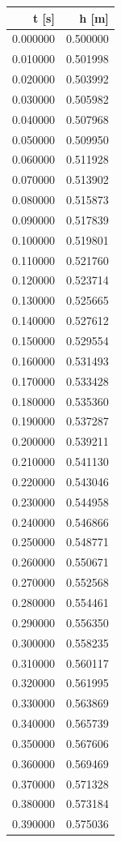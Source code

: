 \begin{tabular}{rr}
\toprule
t [s] & h [m] \\
\midrule
0.000000 & 0.500000 \\
0.010000 & 0.501998 \\
0.020000 & 0.503992 \\
0.030000 & 0.505982 \\
0.040000 & 0.507968 \\
0.050000 & 0.509950 \\
0.060000 & 0.511928 \\
0.070000 & 0.513902 \\
0.080000 & 0.515873 \\
0.090000 & 0.517839 \\
0.100000 & 0.519801 \\
0.110000 & 0.521760 \\
0.120000 & 0.523714 \\
0.130000 & 0.525665 \\
0.140000 & 0.527612 \\
0.150000 & 0.529554 \\
0.160000 & 0.531493 \\
0.170000 & 0.533428 \\
0.180000 & 0.535360 \\
0.190000 & 0.537287 \\
0.200000 & 0.539211 \\
0.210000 & 0.541130 \\
0.220000 & 0.543046 \\
0.230000 & 0.544958 \\
0.240000 & 0.546866 \\
0.250000 & 0.548771 \\
0.260000 & 0.550671 \\
0.270000 & 0.552568 \\
0.280000 & 0.554461 \\
0.290000 & 0.556350 \\
0.300000 & 0.558235 \\
0.310000 & 0.560117 \\
0.320000 & 0.561995 \\
0.330000 & 0.563869 \\
0.340000 & 0.565739 \\
0.350000 & 0.567606 \\
0.360000 & 0.569469 \\
0.370000 & 0.571328 \\
0.380000 & 0.573184 \\
0.390000 & 0.575036 \\

\end{tabular}
